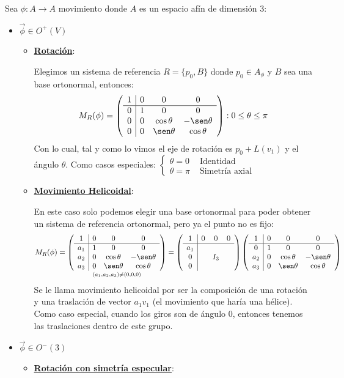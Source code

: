\documentclass[10pt,a4paper,openright]{book}
\begin{document}
Sea $\phi : A\rightarrow A$ movimiento donde $A$ es un espacio afín de dimensión 3:
\begin{itemize}
\item $\vec{\phi} \in O^+(V)$
	\begin{itemize}
	\item \underline{\textbf{Rotación}}: 
	
	Elegimos un sistema de referencia $R=\{p_0, B\}$ donde $p_0 \in A_\phi$ y $B$ sea una base ortonormal, entonces:
	$$M_R (\phi) = \left(\begin{array}{c|ccc}
1 & 0  & 0 & 0 \\
\hline
0 & 1 &  0& 0    \\
0 & 0 &  \cos\theta  & -\sen\theta \\
0 & 0 &  \sen\theta & \cos\theta 
\end{array}
\right) : 0 \leq \theta \leq \pi$$
Con lo cual, tal y como lo vimos el eje de rotación es $p_0 + L(v_1)$ y el ángulo $\theta$. Como casos especiales: $\begin{cases} \theta = 0 & \mbox{ Identidad } \\ \theta = \pi & \mbox{ Simetría axial } \end{cases}$

\item \underline{\textbf{Movimiento Helicoidal}}: 

En este caso solo podemos elegir una base ortonormal para poder obtener un sistema de referencia ortonormal, pero ya el punto no es fijo:
$$M_R (\phi) = \underset{(a_1, a_2, a_3) \neq (0,0,0)}{\left(\begin{array}{c|ccc}
1 & 0  & 0 & 0 \\
\hline
a_1 & 1 &  0& 0    \\
a_2 & 0 &  \cos\theta  & -\sen\theta \\
a_3 & 0 &  \sen\theta & \cos\theta 
\end{array}
\right)} =
\left(\begin{array}{c|ccc}
1 & 0  & 0 & 0 \\
\hline
a_1 &  &  &     \\
0 & & I_3   &  \\
0 &  &   &  
\end{array}
\right)\left(\begin{array}{c|ccc}
1 & 0  & 0 & 0 \\
\hline
0 & 1 &  0& 0    \\
a_2 & 0 &  \cos\theta  & -\sen\theta \\
a_3 & 0 &  \sen\theta & \cos\theta 
\end{array}
\right)$$
Se le llama movimiento helicoidal por ser la composición de una rotación y una traslación de vector $a_1 v_1$ (el movimiento que haría una hélice). Como caso especial, cuando los giros son de ángulo 0, entonces tenemos las traslaciones dentro de este grupo.
\end{itemize}
\newpage
\item $\vec{\phi} \in O^-(3)$
\begin{itemize}
\item \underline{\textbf{Rotación con simetría especular}}: 


\end{itemize}
\end{itemize}
\end{document}
